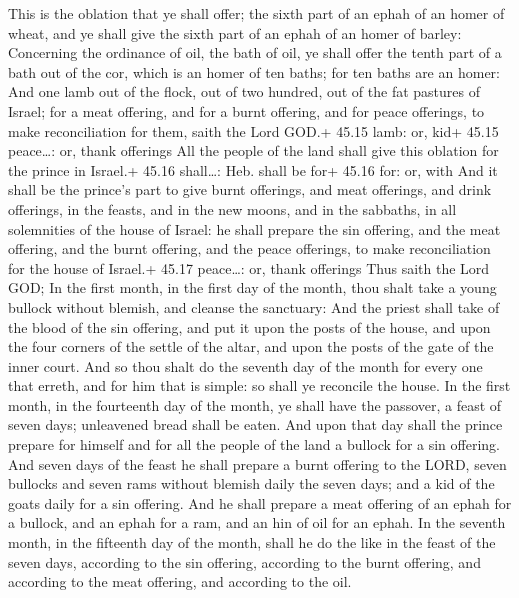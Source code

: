  This is the oblation that ye shall offer; the sixth part
of an ephah of an homer of wheat, and ye shall give the sixth part of an
ephah of an homer of barley:  Concerning the ordinance of
oil, the bath of oil, ye shall offer the tenth part of a bath out of the
cor, which is an homer of ten baths; for ten baths are an homer:
 And one lamb out of the flock, out of two hundred, out of
the fat pastures of Israel; for a meat offering, and for a burnt
offering, and for peace offerings, to make reconciliation for them,
saith the Lord GOD.+ 45.15 lamb: or, kid+ 45.15 peace\ldots: or, thank
offerings  All the people of the land shall give this
oblation for the prince in Israel.+ 45.16 shall\ldots: Heb. shall be
for+ 45.16 for: or, with  And it shall be the prince's part
to give burnt offerings, and meat offerings, and drink offerings, in the
feasts, and in the new moons, and in the sabbaths, in all solemnities of
the house of Israel: he shall prepare the sin offering, and the meat
offering, and the burnt offering, and the peace offerings, to make
reconciliation for the house of Israel.+ 45.17 peace\ldots: or, thank
offerings  Thus saith the Lord GOD; In the first month, in
the first day of the month, thou shalt take a young bullock without
blemish, and cleanse the sanctuary:  And the priest shall
take of the blood of the sin offering, and put it upon the posts of the
house, and upon the four corners of the settle of the altar, and upon
the posts of the gate of the inner court.  And so thou
shalt do the seventh day of the month for every one that erreth, and for
him that is simple: so shall ye reconcile the house.  In
the first month, in the fourteenth day of the month, ye shall have the
passover, a feast of seven days; unleavened bread shall be eaten.
 And upon that day shall the prince prepare for himself and
for all the people of the land a bullock for a sin offering.
 And seven days of the feast he shall prepare a burnt
offering to the LORD, seven bullocks and seven rams without blemish
daily the seven days; and a kid of the goats daily for a sin offering.
 And he shall prepare a meat offering of an ephah for a
bullock, and an ephah for a ram, and an hin of oil for an ephah.
 In the seventh month, in the fifteenth day of the month,
shall he do the like in the feast of the seven days, according to the
sin offering, according to the burnt offering, and according to the meat
offering, and according to the oil.

